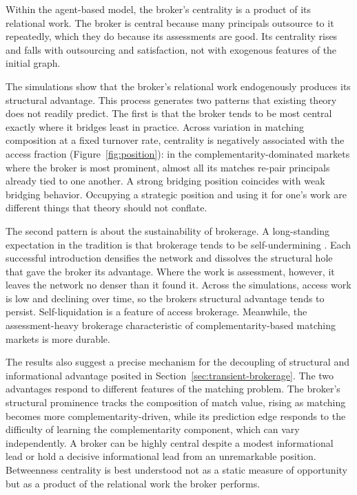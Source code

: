 \documentclass[
]{article}
\begin{document}
Within the agent-based model, the broker's centrality is a product of its relational work. The broker is central because many principals outsource to it repeatedly, which they do because its assessments are good. Its centrality rises and falls with outsourcing and satisfaction, not with exogenous features of the initial graph.

The simulations show that the broker's relational work endogenously produces its structural advantage. This process generates two patterns that existing theory does not readily predict. The first is that the broker tends to be most central exactly where it bridges least in practice. Across variation in matching composition at a fixed turnover rate, centrality is negatively associated with the access fraction (Figure~\ref{fig:position}): in the complementarity-dominated markets where the broker is most prominent, almost all its matches re-pair principals already tied to one another. A strong bridging position coincides with weak bridging behavior. Occupying a strategic position and using it for one's work are different things that theory should not conflate.

The second pattern is about the sustainability of brokerage. A long-standing expectation in the tradition is that brokerage tends to be self-undermining \autocite{burtStructuralHolesSocial1992,burtBridgeDecay2002a,stovelStabilizingBrokerage2011}. Each successful introduction densifies the network and dissolves the structural hole that gave the broker its advantage. Where the work is assessment, however, it leaves the network no denser than it found it. Across the simulations, access work is low and declining over time, so the broker\textquotesingle s structural advantage tends to persist. Self-liquidation is a feature of access brokerage. Meanwhile, the assessment-heavy brokerage characteristic of complementarity-based matching markets is more durable.

The results also suggest a precise mechanism for the decoupling of structural and informational advantage posited in Section~\ref{sec:transient-brokerage}. The two advantages respond to different features of the matching problem. The broker's structural prominence tracks the composition of match value, rising as matching becomes more complementarity-driven, while its prediction edge responds to the difficulty of learning the complementarity component, which can vary independently. A broker can be highly central despite a modest informational lead or hold a decisive informational lead from an unremarkable position. Betweenness centrality is best understood not as a static measure of opportunity but as a product of the relational work the broker performs.
\end{document}
